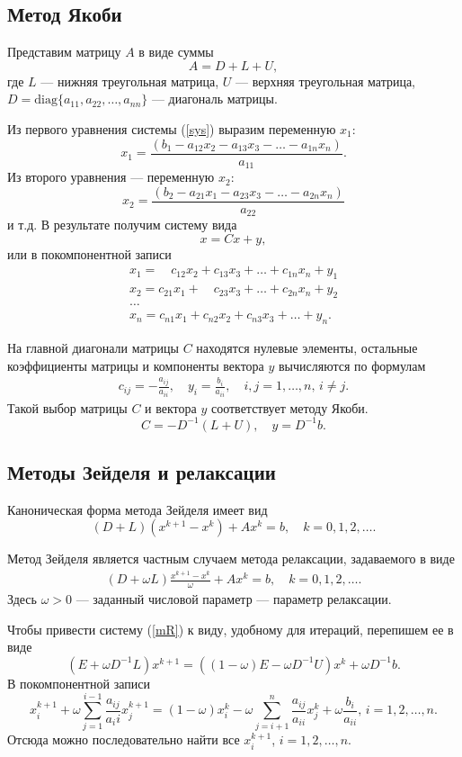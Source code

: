 \documentclass[12pt,a4paper]{article}
\begin{document}
\subsection{Метод Якоби}

Представим матрицу $A$ в виде суммы
$$
A=D+L+U,
$$
где $L$ --- нижняя треугольная матрица, $U$ --- верхняя треугольная матрица, $D=\text{diag}\{a_{11},a_{22},\ldots,a_{nn}\}$ --- диагональ матрицы.

Из первого уравнения системы (\ref{sys}) выразим переменную $x_1$:
$$
x_1=\frac{(b_1-a_{12} x_2-a_{13} x_3-\ldots-a_{1n} x_n)}{a_{11}}.
$$
Из второго уравнения --- переменную $x_2$:
$$
x_2=\frac{(b_2-a_{21} x_1-a_{23} x_3-\ldots-a_{2n} x_n)}{a_{22}}
$$
и т.д. В результате получим систему вида
$$
x=C x+y,
$$
или в покомпонентной записи
\begin{gather*}
x_1=\quad c_{12} x_2+c_{13} x_3+\ldots+c_{1n} x_n+y_1\\
x_2=c_{21} x_1+ \quad c_{23} x_3+\ldots+c_{2n} x_n+y_2\\
\ldots\\
x_n=c_{n1} x_1+c_{n2} x_2+c_{n3} x_3+\ldots+y_n.  
\end{gather*}

На главной диагонали матрицы $C$ находятся нулевые элементы, остальные коэффициенты матрицы и компоненты вектора $y$ вычисляются по формулам
\begin{gather*}
c_{ij}=-\frac{a_{ij}}{a_{ii}}, \quad y_i=\frac{b_i}{a_{ii}}, \quad i,j=1,\ldots,n, \, i \ne j.
\end{gather*}
Такой выбор матрицы $C$ и вектора $y$ соответствует методу Якоби.
$$
C=-D^{-1} (L+U), \quad y=D^{-1} b.
$$

\subsection{Методы Зейделя и релаксации}

Каноническая форма метода Зейделя имеет вид 
$$
(D+L) (x^{k+1}-x^k)+A x^k=b, \quad k=0,1,2,\ldots.
$$

Метод Зейделя является частным случаем метода релаксации, задаваемого в виде
\begin{gather}
(D+\omega L) \frac{x^{k+1}-x^k}{\omega}+A x^k=b, \quad k=0,1,2,\ldots.
\label{mR}
\end{gather}
Здесь $\omega>0$ --- заданный числовой параметр --- параметр релаксации.

Чтобы привести систему (\ref{mR}) к виду, удобному для итераций, перепишем ее в виде
$$
(E+\omega D^{-1} L) x^{k+1}=((1-\omega) E-\omega D^{-1} U)x^k+\omega D^{-1} b.
$$
В покомпонентной записи
$$
x^{k+1}_i+\omega \sum\limits^{i-1}_{j=1} \frac{a_{ij}}{a_ii} x^{k+1}_j=(1-\omega) x_i^k-\omega \sum\limits_{j=i+1}^n\frac{a_{ij}}{a_{ii}}x_j^k+\omega \frac{b_i}{a_{ii}}, \, i=1,2,\ldots,n.
$$
Отсюда можно последовательно найти все $x_i^{k+1}$, $i=1,2,\ldots,n$.
\end{document}
